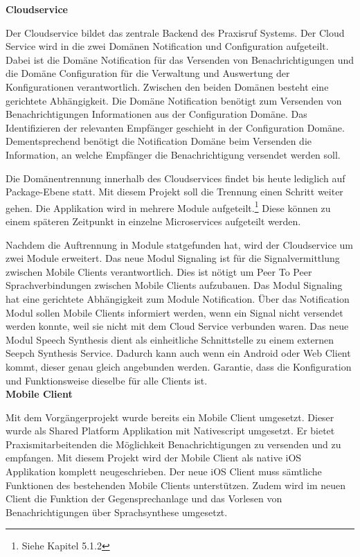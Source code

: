 \textbf{Cloudservice}

Der Cloudservice bildet das zentrale Backend des Praxisruf Systems.
Der Cloud Service wird in die zwei Domänen Notification und Configuration aufgeteilt.
Dabei ist die Domäne Notification für das Versenden von Benachrichtigungen und die Domäne Configuration für die Verwaltung und Auswertung der Konfigurationen verantwortlich.
Zwischen den beiden Domänen besteht eine gerichtete Abhängigkeit.
Die Domäne Notification benötigt zum Versenden von Benachrichtigungen Informationen aus der Configuration Domäne.
Das Identifizieren der relevanten Empfänger geschieht in der Configuration Domäne.
Dementsprechend benötigt die Notification Domäne beim Versenden die Information, an welche Empfänger die Benachrichtigung versendet werden soll.

Die Domänentrennung innerhalb des Cloudservices findet bis heute lediglich auf Package-Ebene statt.
Mit diesem Projekt soll die Trennung einen Schritt weiter gehen.
Die Applikation wird in mehrere Module aufgeteilt.\footnote{Siehe Kapitel 5.1.2}
Diese können zu einem späteren Zeitpunkt in einzelne Microservices aufgeteilt werden.

Nachdem die Auftrennung in Module statgefunden hat, wird der Cloudservice um zwei Module erweitert.
Das neue Modul Signaling ist für die Signalvermittlung zwischen Mobile Clients verantwortlich.
Dies ist nötigt um Peer To Peer Sprachverbindungen zwischen Mobile Clients aufzubauen.
Das Modul Signaling hat eine gerichtete Abhängigkeit zum Module Notification.
Über das Notification Modul sollen Mobile Clients informiert werden, wenn ein Signal nicht versendet werden konnte, weil sie nicht mit dem Cloud Service verbunden waren.
Das neue Modul Speech Synthesis dient als einheitliche Schnittstelle zu einem externen Seepch Synthesis Service.
Dadurch kann auch wenn ein Android oder Web Client kommt, dieser genau gleich angebunden werden.
Garantie, dass die Konfiguration und Funktionsweise dieselbe für alle Clients ist. \\

\textbf{Mobile Client}

Mit dem Vorgängerprojekt wurde bereits ein Mobile Client umgesetzt.
Dieser wurde als Shared Platform Applikation mit Nativescript umgesetzt.
Er bietet Praxismitarbeitenden die Möglichkeit Benachrichtigungen zu versenden und zu empfangen.
Mit diesem Projekt wird der Mobile Client als native iOS Applikation komplett neugeschrieben.
Der neue iOS Client muss sämtliche Funktionen des bestehenden Mobile Clients unterstützen.
Zudem wird im neuen Client die Funktion der Gegensprechanlage und das Vorlesen von Benachrichtigungen über Sprachsynthese umgesetzt.

